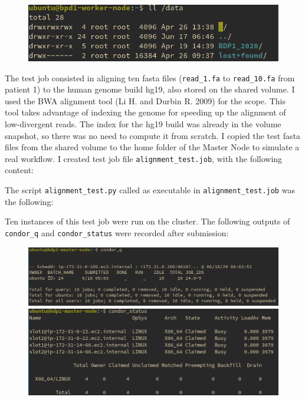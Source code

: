 \documentclass{article}
\begin{document}
\begin{figure}[!h]
    \center%
    \includegraphics[width=.8\textwidth]{./images/nfs_bdp_works.png}
\end{figure}

The test job consisted in aligning ten fasta files (\texttt{read\_1.fa} to \texttt{read\_10.fa} from patient 1) to the human genome build hg19, also stored on the shared volume.
I used the BWA alignment tool (Li H. and Durbin R. 2009) for the scope.
This tool takes advantage of indexing the genome for speeding up the alignment of low-divergent reads.
The index for the hg19 build was already in the volume snapshot, so there was no need to compute it from scratch.
I copied the test fasta files from the shared volume to the home folder of the Master Node to simulate a real workflow.
I created test job file \texttt{alignment\_test.job}, with the following content:



The script \texttt{alignment\_test.py} called as executable in \texttt{alignment\_test.job} was the following:



Ten instances of this test job were run on the cluster.
The following outputs of \texttt{condor\_q} and \texttt{condor\_status} were recorded after submission:

\begin{figure}[!h]
    \center%
    \includegraphics[width=\textwidth]{./images/condor_q.png}
    \includegraphics[width=\textwidth]{./images/condor_status_busy.png}
\end{figure}
\FloatBarrier%
\end{document}
